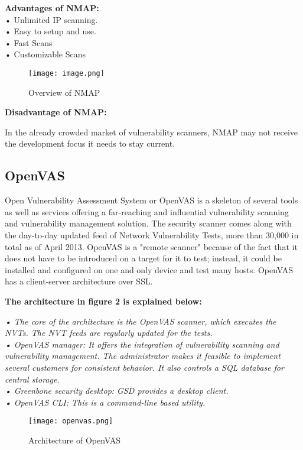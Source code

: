\documentclass[conference]{IEEEtran}
\begin{document}
\textbf{Advantages of NMAP:}
\\• Unlimited IP scanning.
\\• Easy to setup and use.
\\• Fast Scans
\\•  Customizable Scans

\begin{figure}[h]
    \centering
    \texttt{[image: image.png]}
    \caption{Overview of NMAP}
    \label{1}
\end{figure}

\textbf{Disadvantage of NMAP:}

In the already crowded market of vulnerability scanners, NMAP may not receive the development focus it needs to stay current.

\subsection{OpenVAS}
Open Vulnerability Assessment System or OpenVAS is a skeleton of several tools as well as services offering a far-reaching and influential vulnerability scanning and vulnerability management solution. The security scanner comes along with the day-to-day updated feed of Network Vulnerability Tests, more than 30,000 in total as of April 2013. OpenVAS is a "remote scanner" because of the fact that it does not have to be introduced on a target for it to test; instead, it could be installed and configured on one and only device and test many hosts. OpenVAS has a client-server architecture over SSL.

\textbf{The architecture in figure 2 is explained below:}

\textit{
• The core of the architecture is the OpenVAS scanner, which executes the NVTs. The NVT feeds are regularly updated for the tests.
\\• OpenVAS manager: It offers the integration of vulnerability scanning and vulnerability management. The administrator makes it feasible to implement several customers for consistent behavior. It also controls a SQL database for central storage.
\\• Greenbone security desktop: GSD provides a desktop client.
\\• OpenVAS CLI: This is a command-line based utility.
}
\begin{figure}[h]
    \centering
    \texttt{[image: openvas.png]}
    \caption{Architecture of OpenVAS}
    \label{fig:enter-label}
\end{figure}
\end{document}
